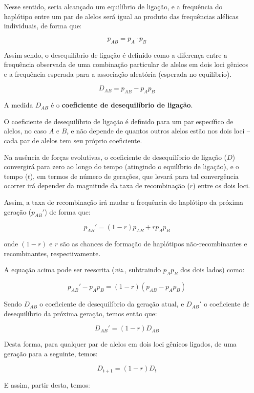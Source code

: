 \documentclass[
]{book}
\begin{document}
Nesse sentido, seria alcançado um equilíbrio de ligação, e a frequência do haplótipo entre um par de alelos será igual ao produto das frequências alélicas individuais, de forma que:

\[p_{AB} = p_{A} \cdot p_{B}\]

Assim sendo, o desequilíbrio de ligação é definido como a diferença entre a frequência observada de uma combinação particular de alelos em dois loci gênicos e a frequência esperada para a associação aleatória (esperada no equilíbrio).

\[D_{AB} = p_{AB} - p_{A}p_{B}\]

A medida \(D_{AB}\) é o \textbf{coeficiente de desequilíbrio de ligação}.

O coeficiente de desequilíbrio de ligação é definido para um par específico de alelos, no caso \(A\) e \(B\), e não depende de quantos outros alelos estão nos dois loci -- cada par de alelos tem seu próprio coeficiente.

Na ausência de forças evolutivas, o coeficiente de desequilíbrio de ligação (\(D\)) convergirá para zero ao longo do tempo (atingindo o equilíbrio de ligação), e o tempo (\(t\)), em termos de número de gerações, que levará para tal convergência ocorrer irá depender da magnitude da taxa de recombinação (\(r\)) entre os dois loci.

Assim, a taxa de recombinação irá mudar a frequência do haplótipo da próxima geração (\(p_{AB}'\)) de forma que:

\[p_{AB}' = \left( 1-r \right) p_{AB} + rp_{A}p_{B}\]

onde \((1-r)\) e \(r\) são as chances de formação de haplótipos não-recombinantes e recombinantes, respectivamente.

A equação acima pode ser reescrita (\emph{viz.}, subtraindo \(p_{A}p_{B}\) dos dois lados) como:

\[p_{AB}' - p_{A}p_{B} = \left( 1-r \right) \left( p_{AB} - p_{A}p_{B} \right)\]

Sendo \(D_{AB}\) o coeficiente de desequilíbrio da geração atual, e \(D_{AB}'\) o coeficiente de desequilíbrio da próxima geração, temos então que:

\[D_{AB}' = \left( 1-r \right) D_{AB}\]

Desta forma, para qualquer par de alelos em dois loci gênicos ligados, de uma geração para a seguinte, temos:

\[D_{t+1} = \left( 1-r \right) D_{t}\]

E assim, partir desta, temos:
\end{document}
